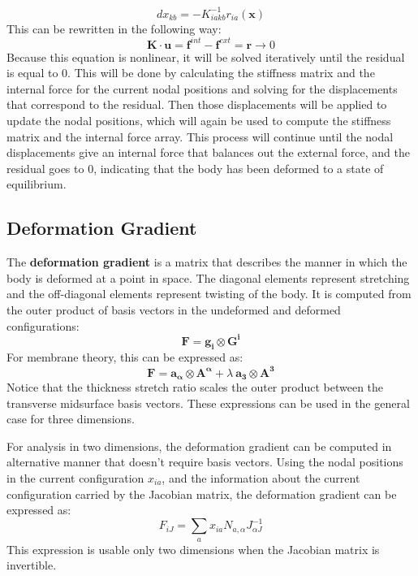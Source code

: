 \documentclass[]{spie}  %
\begin{document}
\begin{equation}
dx_{kb} = -K^{-1}_{iakb} r_{ia}(\bm{x})
\end{equation}
This can be rewritten in the following way:
\begin{equation}
\label{eq: displacement solving equation}
\bm{K} \cdot \bm{u} = \bm{f}^{int} - \bm{f}^{ext} = \bm{r} \rightarrow 0
\end{equation}
Because this equation is nonlinear, it will be solved iteratively until the residual is equal to 0. This will be done by calculating the stiffness matrix and the internal force for the current nodal positions and solving for the displacements that correspond to the residual. Then those displacements will be applied to update the nodal positions, which will again be used to compute the stiffness matrix and the internal force array. This process will continue until the nodal displacements give an internal force that balances out the external force, and the residual goes to 0, indicating that the body has been deformed to a state of equilibrium.


\subsection{Deformation Gradient}
The \textbf{deformation gradient} is a matrix that describes the manner in which the body is deformed at a point in space. The diagonal elements represent stretching and the off-diagonal elements represent twisting of the body. It is computed from the outer product of basis vectors in the undeformed and deformed configurations:
\begin{equation}
\label{eq: deformation gradient}
\bm{F} = \bm{g_i} \otimes \bm{G^i}
\end{equation}
For membrane theory, this can be expressed as:
\begin{equation}
\label{eq: deformation gradient membrane theory}
\bm{F} = \bm{a_\alpha} \otimes \bm{A^\alpha} + \lambda \ \bm{a_3} \otimes \bm{A^3}
\end{equation}
Notice that the thickness stretch ratio scales the outer product between the transverse midsurface basis vectors. These expressions can be used in the general case for three dimensions. 

For analysis in two dimensions, the deformation gradient can be computed in alternative manner that doesn't require basis vectors. Using the nodal positions in the current configuration $x_{ia}$, and the information about the current configuration carried by the Jacobian matrix, the deformation gradient can be expressed as:
\begin{equation}
\label{eq: deformation gradient using Jacobian matrix}
F_{iJ} = \sum\limits_{a} x_{ia} N_{a,\alpha} J_{\alpha J}^{-1}
\end{equation}
This expression is usable only two dimensions when the Jacobian matrix is invertible. 
\end{document}
